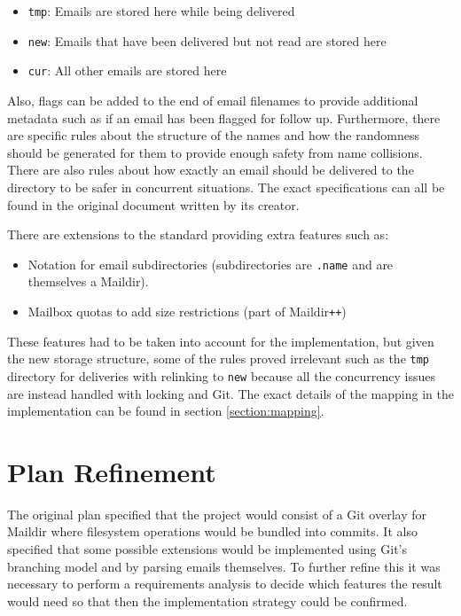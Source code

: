 \begin{itemize}
\item \texttt{tmp}: Emails are stored here while being delivered
\item \texttt{new}: Emails that have been delivered but not read are stored here
\item \texttt{cur}: All other emails are stored here
\end{itemize}

Also, flags can be added to the end of email filenames to provide additional metadata such as if an email has been flagged for follow up. Furthermore, there are specific rules about the structure of the names and how the randomness should be generated for them to provide enough safety from name collisions. There are also rules about how exactly an email should be delivered to the directory to be safer in concurrent situations. The exact specifications can all be found in the original document written by its creator\cite{bernstein2000maildir}.

There are extensions to the standard providing extra features such as:

\begin{itemize}
\item Notation for email subdirectories (subdirectories are \texttt{.name} and are themselves a Maildir).
\item Mailbox quotas to add size restrictions (part of Maildir\texttt{++})
\end{itemize}

These features had to be taken into account for the implementation, but given the new storage structure, some of the rules proved irrelevant such as the \texttt{tmp} directory for deliveries with relinking to \texttt{new} because all the concurrency issues are instead handled with locking and Git. The exact details of the mapping in the implementation can be found in section \ref{section:mapping}.

\section{Plan Refinement}

The original plan specified that the project would consist of a Git overlay for Maildir where filesystem operations would be bundled into commits. It also specified that some possible extensions would be implemented using Git's branching model and by parsing emails themselves. To further refine this it was necessary to perform a requirements analysis to decide which features the result would need so that then the implementation strategy could be confirmed.

